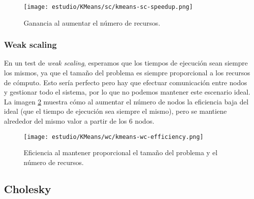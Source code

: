\begin{figure}[H]
	\centering 
	\caption{Ganancia al aumentar el número de recursos.}
	\texttt{[image: estudio/KMeans/sc/kmeans-sc-speedup.png]}
	\label{fig:sc-speedup}
\end{figure}

\subsubsection{Weak scaling}

En un test de \textit{weak scaling}, esperamos que los tiempos de ejecución sean siempre los mismos, ya que el tamaño del problema es siempre proporcional a los recursos de cómputo. Esto sería perfecto pero hay que efectuar comunicación entre nodos y gestionar todo el sistema, por lo que no podemos mantener este escenario ideal. La imagen \ref{fig:wc-effic} muestra cómo al aumentar el número de nodos la eficiencia baja del ideal (que el tiempo de ejecución sea siempre el mismo), pero se mantiene alrededor del mismo valor a partir de los 6 nodos.

\begin{figure}[H]
	\centering 
	\caption{Eficiencia al mantener proporcional el tamaño del problema y el número de recursos.}
	\texttt{[image: estudio/KMeans/wc/kmeans-wc-efficiency.png]}
	\label{fig:wc-effic}
\end{figure}

\subsection{Cholesky}







